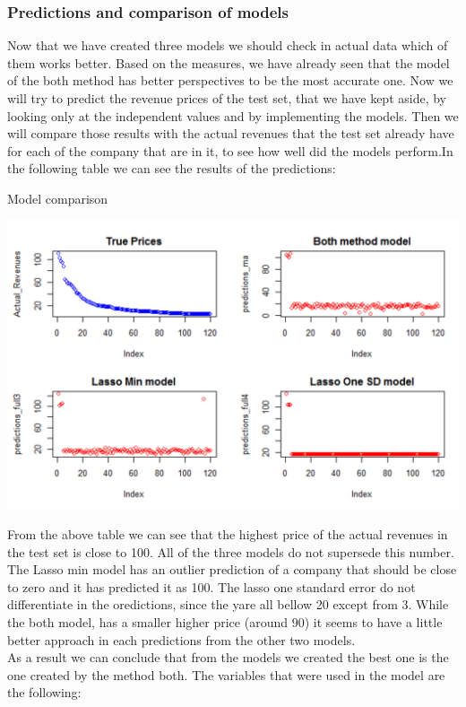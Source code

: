 \documentclass{book}
\begin{document}
\subsubsection{Predictions and comparison of models}
Now that we have created three models we should check in actual data which of them works better. Based on the measures, we have already seen that the model of the both method has better perspectives to be the most accurate one. Now we will try to predict the revenue prices of the test set, that we have kept aside, by looking only at the independent values and by implementing the models. Then we will compare those results with the actual revenues that the test set already have for each of the company that are in it, to see how well did the models perform.In the following table we can see the results of the predictions:
\begin{table}[H]
\centering
\caption{Model comparison}
\begin{center}
\includegraphics[scale=0.8]{../R/photos/85_pred_mod.png}    \\
\end{center}
\end{table}
From the above table we can see that the highest price of the actual revenues in the test set is close to 100. All of the three models do not supersede this number. The Lasso min model has an outlier prediction of a company that should be close to zero and it has predicted it as 100. The lasso one standard error do not differentiate in the oredictions, since the yare all bellow 20 except from 3. While the both model, has a smaller higher price (around 90) it seems to have a little better approach in each predictions from the other two models.\\
As a result we can conclude that from the models we created the best one is the one created by the method both. The variables that were used in the model are the following:
\end{document}
